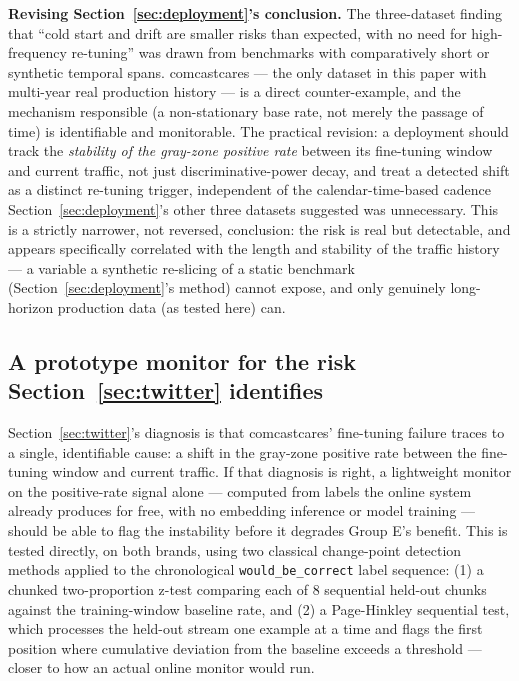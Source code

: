 \documentclass[11pt]{article}
\begin{document}
\textbf{Revising Section~\ref{sec:deployment}'s conclusion.} The three-dataset finding that ``cold start and drift are smaller risks than expected, with no need for high-frequency re-tuning'' was drawn from benchmarks with comparatively short or synthetic temporal spans. comcastcares --- the only dataset in this paper with multi-year real production history --- is a direct counter-example, and the mechanism responsible (a non-stationary base rate, not merely the passage of time) is identifiable and monitorable. The practical revision: a deployment should track the \emph{stability of the gray-zone positive rate} between its fine-tuning window and current traffic, not just discriminative-power decay, and treat a detected shift as a distinct re-tuning trigger, independent of the calendar-time-based cadence Section~\ref{sec:deployment}'s other three datasets suggested was unnecessary. This is a strictly narrower, not reversed, conclusion: the risk is real but detectable, and appears specifically correlated with the length and stability of the traffic history --- a variable a synthetic re-slicing of a static benchmark (Section~\ref{sec:deployment}'s method) cannot expose, and only genuinely long-horizon production data (as tested here) can.

\subsection{A prototype monitor for the risk Section~\ref{sec:twitter} identifies}
\label{sec:monitor}

Section~\ref{sec:twitter}'s diagnosis is that comcastcares' fine-tuning failure traces to a single, identifiable cause: a shift in the gray-zone positive rate between the fine-tuning window and current traffic. If that diagnosis is right, a lightweight monitor on the positive-rate signal alone --- computed from labels the online system already produces for free, with no embedding inference or model training --- should be able to flag the instability before it degrades Group E's benefit. This is tested directly, on both brands, using two classical change-point detection methods applied to the chronological \texttt{would\_\allowbreak{}be\_\allowbreak{}correct} label sequence: (1) a chunked two-proportion z-test comparing each of 8 sequential held-out chunks against the training-window baseline rate, and (2) a Page-Hinkley sequential test, which processes the held-out stream one example at a time and flags the first position where cumulative deviation from the baseline exceeds a threshold --- closer to how an actual online monitor would run.
\end{document}
